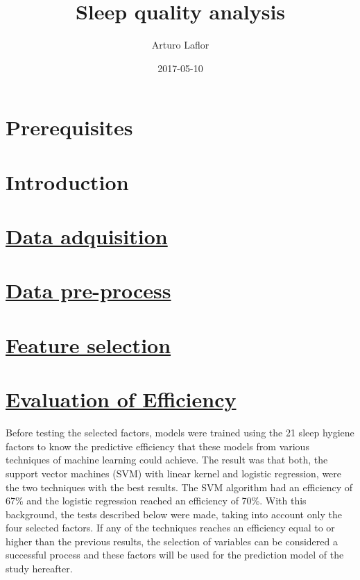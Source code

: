 \documentclass[]{book}
\title{Sleep quality analysis}
\author{Arturo Laflor}
\date{2017-05-10}
\begin{document}
\maketitle

{
\setcounter{tocdepth}{1}
\tableofcontents
}
\chapter{Prerequisites}\label{prerequisites}

\chapter{Introduction}\label{intro}

\hypertarget{data-adquisition}{\chapter{\texorpdfstring{\protect\hyperlink{data-adquisition}{Data
adquisition}}{Data adquisition}}\label{data-adquisition}}

\chapter{\texorpdfstring{\protect\hyperlink{data-preprocess}{Data
pre-process}}{Data pre-process}}\label{data-pre-process}

\hypertarget{feature-selection}{\chapter{\texorpdfstring{\protect\hyperlink{feature-selection}{Feature
selection}}{Feature selection}}\label{feature-selection}}

\chapter{\texorpdfstring{\protect\hyperlink{efficiency-evaluation}{Evaluation
of
Efficiency}}{Evaluation of Efficiency}}\label{evaluation-of-efficiency}

Before testing the selected factors, models were trained using the 21
sleep hygiene factors to know the predictive efficiency that these
models from various techniques of machine learning could achieve. The
result was that both, the support vector machines (SVM) with linear
kernel and logistic regression, were the two techniques with the best
results. The SVM algorithm had an efficiency of 67\% and the logistic
regression reached an efficiency of 70\%. With this background, the
tests described below were made, taking into account only the four
selected factors. If any of the techniques reaches an efficiency equal
to or higher than the previous results, the selection of variables can
be considered a successful process and these factors will be used for
the prediction model of the study hereafter.
\end{document}
